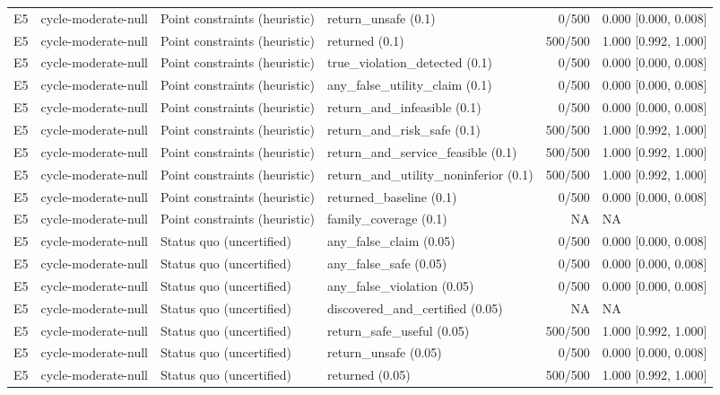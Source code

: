 \begin{longtable}{p{.04\linewidth}p{.18\linewidth}p{.19\linewidth}p{.16\linewidth}r p{.21\linewidth}}
E5 & cycle-moderate-null & Point constraints (heuristic) & return\_unsafe (0.1) & 0/500 & 0.000 [0.000, 0.008]\\
E5 & cycle-moderate-null & Point constraints (heuristic) & returned (0.1) & 500/500 & 1.000 [0.992, 1.000]\\
E5 & cycle-moderate-null & Point constraints (heuristic) & true\_violation\_detected (0.1) & 0/500 & 0.000 [0.000, 0.008]\\
E5 & cycle-moderate-null & Point constraints (heuristic) & any\_false\_utility\_claim (0.1) & 0/500 & 0.000 [0.000, 0.008]\\
E5 & cycle-moderate-null & Point constraints (heuristic) & return\_and\_infeasible (0.1) & 0/500 & 0.000 [0.000, 0.008]\\
E5 & cycle-moderate-null & Point constraints (heuristic) & return\_and\_risk\_safe (0.1) & 500/500 & 1.000 [0.992, 1.000]\\
E5 & cycle-moderate-null & Point constraints (heuristic) & return\_and\_service\_feasible (0.1) & 500/500 & 1.000 [0.992, 1.000]\\
E5 & cycle-moderate-null & Point constraints (heuristic) & return\_and\_utility\_noninferior (0.1) & 500/500 & 1.000 [0.992, 1.000]\\
E5 & cycle-moderate-null & Point constraints (heuristic) & returned\_baseline (0.1) & 0/500 & 0.000 [0.000, 0.008]\\
E5 & cycle-moderate-null & Point constraints (heuristic) & family\_coverage (0.1) & NA & NA\\
E5 & cycle-moderate-null & Status quo (uncertified) & any\_false\_claim (0.05) & 0/500 & 0.000 [0.000, 0.008]\\
E5 & cycle-moderate-null & Status quo (uncertified) & any\_false\_safe (0.05) & 0/500 & 0.000 [0.000, 0.008]\\
E5 & cycle-moderate-null & Status quo (uncertified) & any\_false\_violation (0.05) & 0/500 & 0.000 [0.000, 0.008]\\
E5 & cycle-moderate-null & Status quo (uncertified) & discovered\_and\_certified (0.05) & NA & NA\\
E5 & cycle-moderate-null & Status quo (uncertified) & return\_safe\_useful (0.05) & 500/500 & 1.000 [0.992, 1.000]\\
E5 & cycle-moderate-null & Status quo (uncertified) & return\_unsafe (0.05) & 0/500 & 0.000 [0.000, 0.008]\\
E5 & cycle-moderate-null & Status quo (uncertified) & returned (0.05) & 500/500 & 1.000 [0.992, 1.000]\\

\end{longtable}
